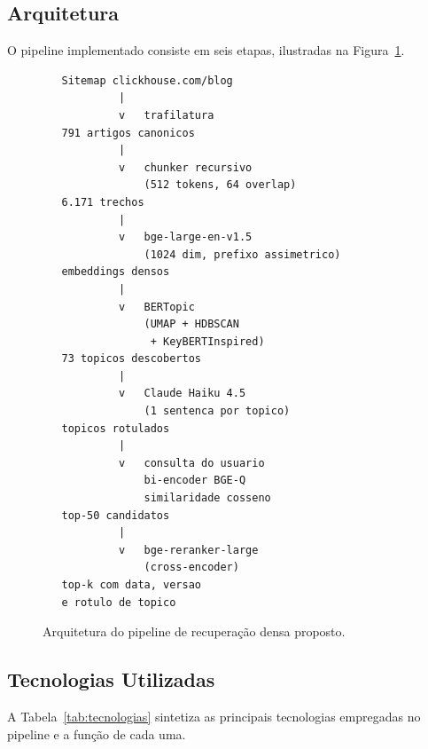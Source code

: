 \documentclass[11pt,a4paper]{article}
\begin{document}
\subsection{Arquitetura}

O pipeline implementado consiste em seis etapas, ilustradas na Figura~\ref{fig:arquitetura}.

\begin{figure}[!ht]
\centering
\begin{minipage}{0.95\linewidth}
\begin{verbatim}
   Sitemap clickhouse.com/blog
            |
            v   trafilatura
   791 artigos canonicos
            |
            v   chunker recursivo
                (512 tokens, 64 overlap)
   6.171 trechos
            |
            v   bge-large-en-v1.5
                (1024 dim, prefixo assimetrico)
   embeddings densos
            |
            v   BERTopic
                (UMAP + HDBSCAN
                 + KeyBERTInspired)
   73 topicos descobertos
            |
            v   Claude Haiku 4.5
                (1 sentenca por topico)
   topicos rotulados
            |
            v   consulta do usuario
                bi-encoder BGE-Q
                similaridade cosseno
   top-50 candidatos
            |
            v   bge-reranker-large
                (cross-encoder)
   top-k com data, versao
   e rotulo de topico
\end{verbatim}
\end{minipage}
\caption{Arquitetura do pipeline de recuperação densa proposto.}
\label{fig:arquitetura}
\end{figure}

\subsection{Tecnologias Utilizadas}

A Tabela~\ref{tab:tecnologias} sintetiza as principais tecnologias empregadas no pipeline e a função de cada uma.
\end{document}
